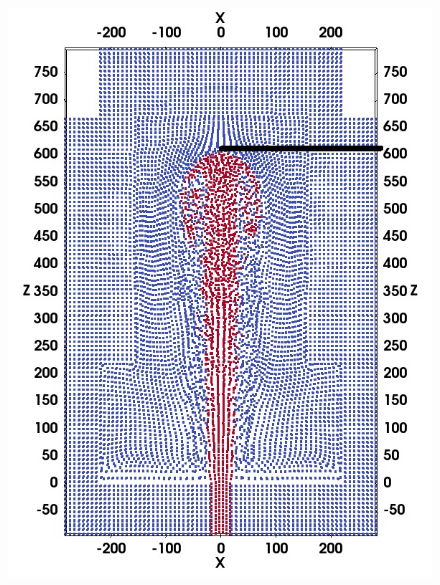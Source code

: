 \begin{figure}[H]
\begin{minipage}[t]{.325\textwidth}
    \end{minipage}%
    \\
    \centering
    \begin{minipage}[t]{.325 \textwidth}
        \centering
        \includegraphics[width=0.99 \textwidth]{./Figures/GSPH-HLLC-t3-cutView}
    \end{minipage}%
    \begin{minipage}[t]{.325\textwidth}
        \centering

\end{minipage}
\end{figure}

